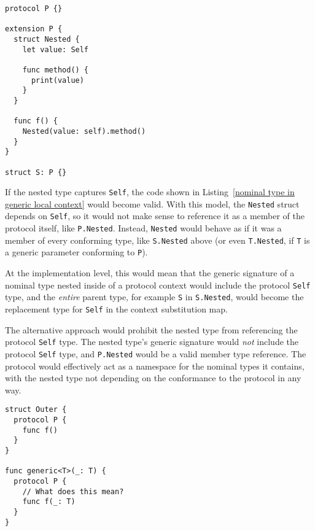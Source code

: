 \documentclass[a4paper,headsepline,bibliography=totoc,toc=flat,fleqn,twoside=semi]{scrbook}
\theoremstyle{definition}
\theoremstyle{definition}
\theoremstyle{definition}
\begin{document}
\begin{listing}\label{nominal type in protocol context}
\begin{Verbatim}
protocol P {}

extension P {
  struct Nested {
    let value: Self

    func method() {
      print(value)
    }
  }
  
  func f() {
    Nested(value: self).method()
  }
}

struct S: P {}
\end{Verbatim}
\end{listing}
If the nested type captures \texttt{Self}, the code shown in Listing~\ref{nominal type in generic local context} would become valid. With this model, the \texttt{Nested} struct depends on \texttt{Self}, so it would not make sense to reference it as a member of the protocol itself, like \texttt{P.Nested}. Instead, \texttt{Nested} would behave as if it was a member of every conforming type, like \texttt{S.Nested} above (or even \texttt{T.Nested}, if \texttt{T} is a generic parameter conforming to \texttt{P}).

At the implementation level, this would mean that the generic signature of a nominal type nested inside of a protocol context would include the protocol \texttt{Self} type, and the \emph{entire} parent type, for example \texttt{S} in \texttt{S.Nested}, would become the replacement type for \texttt{Self} in the context substitution map.

The alternative approach would prohibit the nested type from referencing the protocol \texttt{Self} type. The nested type's generic signature would \emph{not} include the protocol \texttt{Self} type, and \texttt{P.Nested} would be a valid member type reference. The protocol would effectively act as a namespace for the nominal types it contains, with the nested type not depending on the conformance to the protocol in any way.

\begin{listing}\label{protocol nested inside type}
\begin{Verbatim}
struct Outer {
  protocol P {
    func f()
  }
}

func generic<T>(_: T) {
  protocol P {
    // What does this mean?
    func f(_: T)
  }
}
\end{Verbatim}
\end{listing}
\end{document}
